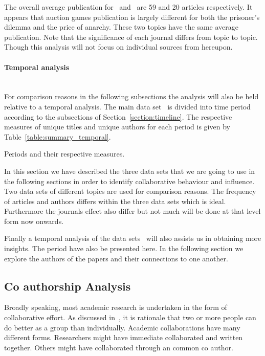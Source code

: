 \documentclass{article}
\theoremstyle{definition}
\begin{document}
The overall average publication for~\cite{} and~\cite{} are 59 and 20 articles
respectively. It appears that auction games publication is largely different
for both the prisoner's dilemma and the price of anarchy. These two topics have
the same average publication. Note that the significance of each journal differs
from topic to topic. Though this analysis will not focus on individual sources
from hereupon.

\paragraph{Temporal analysis}
\mbox{ }\\

For comparison reasons in the following subsections the analysis will also be
held relative to a temporal analysis. The main data set~\cite{}
is divided into time period according to the subsections of Section~\ref{section:timeline}.
The respective measures of unique titles and unique authors for each period is
given by Table~\ref{table:summary_temporal}.

\begin{table}[!hbtp]
    \begin{center}
    
    \end{center}
    \caption{Periods and their respective measures.}
    \label{table:summary_temporal}
\end{table}

In this section we have described the three data sets that we are going to use
in the following sections in order to identify collaborative behaviour and influence.
Two data sets of different topics are used for comparison reasons. The frequency of
articles and authors differs within the three data sets which is ideal. Furthermore
the journals effect also differ but not much will be done at that level form now
onwards.

Finally a temporal analysis of the data sets~\cite{} will also assists us in
obtaining more insights. The period have also be presented here.
In the following section we explore the authors of the papers and their
connections to one another.

\subsection{Co authorship Analysis}

Broadly speaking, most academic research is undertaken in the form of
collaborative effort. As discussed in~\cite{Kyvik2017}, it is rationale that two
or more people can do better as a group than individually. Academic collaborations
have many different forms. Researchers might have immediate collaborated and
written together. Others might have collaborated through an common co author.
\end{document}
